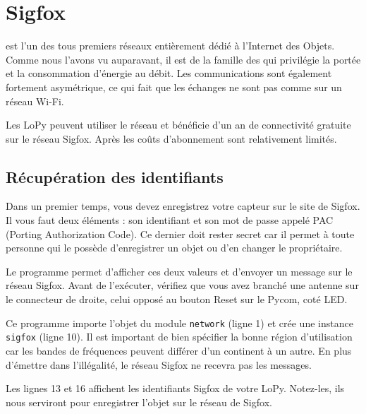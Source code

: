 \chapter{Sigfox}

\begin{figure}
\end{figure}


 est l'un des tous premiers réseaux entièrement dédié à l'Internet des Objets. Comme nous l'avons vu auparavant, il est de la famille des  qui privilégie la portée et la consommation d'énergie au débit. Les communications sont également fortement asymétrique, ce qui fait que les échanges ne sont pas comme sur un réseau Wi-Fi. 

     \vspace{1em}

Les LoPy peuvent utiliser le réseau et bénéficie d'un an de connectivité gratuite sur le réseau Sigfox. Après les coûts d'abonnement sont relativement limités.

\section{Récupération des identifiants}

Dans un premier temps, vous devez enregistrez votre capteur sur le site de Sigfox. Il vous faut deux éléments : son identifiant et son mot de passe appelé PAC (Porting Authorization Code). Ce dernier doit rester secret car il permet à toute personne qui le possède d’enregistrer un objet ou d’en changer le propriétaire.

Le programme  permet d’afficher ces deux valeurs et d’envoyer un message sur le réseau Sigfox. 
Avant de l’exécuter, vérifiez que vous avez branché une antenne sur le connecteur de droite, celui opposé au bouton Reset sur le Pycom, coté LED.


Ce programme importe l’objet  du module \texttt{network} (ligne 1) et crée une instance \texttt{sigfox} (ligne 10). Il est important de bien spécifier la bonne région d’utilisation car les bandes de fréquences peuvent différer d'un continent à un autre. En plus d’émettre dans l’illégalité, le réseau Sigfox ne recevra pas les messages.

Les lignes 13 et 16 affichent les identifiants Sigfox de votre LoPy. Notez-les, ils nous serviront pour enregistrer l’objet sur le réseau de Sigfox.


